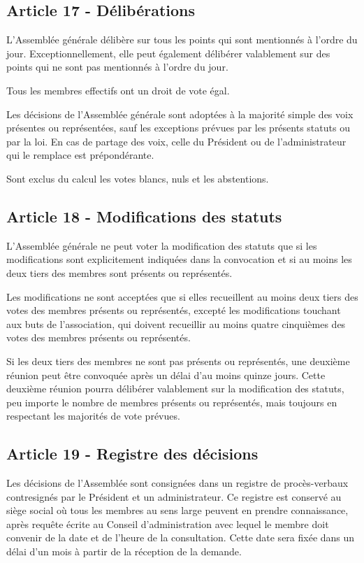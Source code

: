 \documentclass[12pt]{article}
\begin{document}
\subsection*{Article 17 - Délibérations}
L'Assemblée générale délibère sur tous les points qui sont mentionnés à l'ordre du jour. Exceptionnellement, elle peut également délibérer valablement sur des points qui ne sont pas mentionnés à l'ordre du jour.

Tous les membres effectifs ont un droit de vote égal.

Les décisions de l'Assemblée générale sont adoptées à la majorité simple des voix présentes ou représentées, sauf les exceptions prévues par les présents statuts ou par la loi. En cas de partage des voix, celle du Président ou de l'administrateur qui le remplace est prépondérante.

Sont exclus du calcul les votes blancs, nuls et les abstentions.
\subsection*{Article 18 - Modifications des statuts}
L'Assemblée générale ne peut voter la modification des statuts que si les modifications sont explicitement indiquées dans la convocation et si au moins les deux tiers des membres sont présents ou représentés.

Les modifications ne sont acceptées que si elles recueillent au moins deux tiers des votes des membres présents ou représentés, excepté les modifications touchant aux buts de l'association, qui doivent recueillir au moins quatre cinquièmes des votes des membres présents ou représentés.

Si les deux tiers des membres ne sont pas présents ou représentés, une deuxième réunion peut être convoquée après un délai d'au moins quinze jours. Cette deuxième réunion pourra délibérer valablement sur la modification des statuts, peu importe le nombre de membres présents ou représentés, mais toujours en respectant les majorités de vote prévues.
\subsection*{Article 19 - Registre des décisions}
Les décisions de l'Assemblée sont consignées dans un registre de procès-verbaux contresignés par le Président et un administrateur. Ce registre est conservé au siège social où tous les membres au sens large peuvent en prendre connaissance, après requête écrite au Conseil d'administration avec lequel le membre doit convenir de la date et de l'heure de la consultation. Cette date sera fixée dans un délai d'un mois à partir de la réception de la demande.
\end{document}
